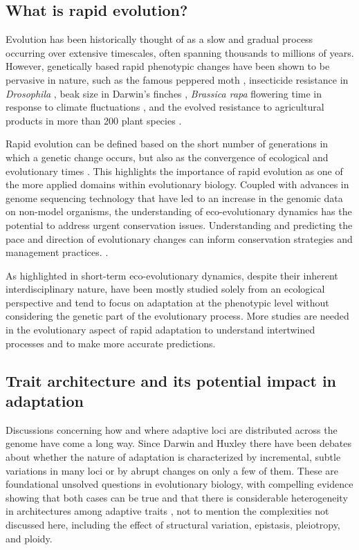 \documentclass{article}
\begin{document}
\subsection{What is rapid evolution?}
Evolution has been historically thought of as a slow and gradual process occurring over extensive timescales, often spanning thousands to millions of years. However, genetically based rapid phenotypic changes have been shown to be pervasive in nature, such as the famous peppered moth \citep{Cook2013-bs}, insecticide resistance in \textit{Drosophila} \citep{Daborn2002-is}, beak size in Darwin’s finches \citep{Grant2008-uc}, \textit{Brassica rapa} flowering time in response to climate fluctuations \citep{Franks2007-ys}, and the evolved resistance to agricultural products in more than 200 plant species \citep{Heap2020}. 

Rapid evolution can be defined based on the short number of generations in which a genetic change occurs, but also as the convergence of ecological and evolutionary times \citep{Hairston2005-qo}. This highlights the importance of rapid evolution as one of the more applied domains within evolutionary biology. Coupled with advances in genome sequencing technology that have led to an increase in the genomic data on non-model organisms, the understanding of eco-evolutionary dynamics has the potential to address urgent conservation issues. Understanding and predicting the pace and direction of evolutionary changes can inform conservation strategies and management practices. \citep{Bay2017-uu, Coulson2017-yh, Forester2022-yl}.

As highlighted in \citep{Yamamichi2022-yj} short-term eco-evolutionary dynamics, despite their inherent interdisciplinary nature, have been mostly studied solely from an ecological perspective and tend to focus on adaptation at the phenotypic level without considering the genetic part of the evolutionary process. More studies are needed in the evolutionary aspect of rapid adaptation to understand intertwined processes and to make more accurate predictions. \citep{Rudman2022-uc}

\subsection{Trait architecture and its potential impact in adaptation}
Discussions concerning how and where adaptive loci are distributed across the genome have come a long way. Since Darwin \citeyearpar{Darwin1859-yh} and Huxley \citeyearpar{Huxley1860} there have been debates about whether the nature of adaptation is characterized by incremental, subtle variations in many loci or by abrupt changes on only a few of them. These are foundational unsolved questions in evolutionary biology, with compelling evidence showing that both cases can be true and that there is considerable heterogeneity in architectures among adaptive traits \citep{Orr1992-xj, Orr1998-pr}, not to mention the complexities not discussed here, including the effect of structural variation, epistasis, pleiotropy, and ploidy. 
\end{document}
